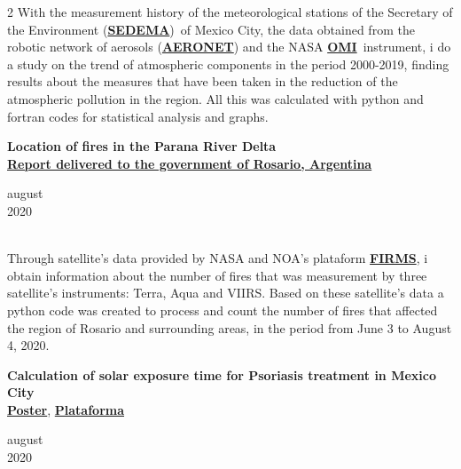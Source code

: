 \documentclass[a3paper,16pt]{adcv}
\newcommand*{\aeronet}{\href{https://aeronet.gsfc.nasa.gov/}{\textbf{AERONET}}}
\newcommand*{\sedema}{\href{https://www.sedema.cdmx.gob.mx/}{\textbf{SEDEMA}}}
\newcommand*{\omi}{\href{https://aura.gsfc.nasa.gov/omi.html}{\textbf{OMI}}}
\begin{document}
\begin{multicols}{2}
    With the measurement history of the meteorological stations of the Secretary of the Environment (\sedema)~of Mexico City,
    the data obtained from the robotic network of aerosols (\aeronet) and the NASA \omi~instrument, i do a study on the trend of atmospheric components
     in the period 2000-2019, finding results about the measures that have been taken in the reduction of the atmospheric pollution in the region.
     All this was calculated with python and fortran codes for statistical analysis and graphs.\\

  \begin{minipage}{0.8\linewidth}
    \textbf{Location of fires in the Parana River Delta}\\
    \href{https://github.com/giovannilopez9808/Posters_templates/blob/master/Informe\%20IFIR/Focos\%20de\%20incendio\%20en\%20las\%20islas\%20del\%20Paran\%C3\%A1\%20\%20frente\%20a\%20Rosario\%20\%20(Piacentini\%2C\%20Ipi\%C3\%B1a\%2C\%20Lopez-Padilla\%2C\%20Bolmaro)\%20(Piacentini).pdf}{\textbf{Report delivered to the government of Rosario, Argentina}}
  \end{minipage}
    \begin{minipage}{0.2\linewidth}
      \vspace{-0.7cm}
      \begin{flushright}
        august
        \\2020
      \end{flushright}
    \end{minipage}\\
  
    Through satellite's data provided by NASA and NOA's plataform \href{https://firms.modaps.eosdis.nasa.gov/}{\textbf{FIRMS}}, i obtain information about the
    number of fires that was measurement by three satellite's instruments: Terra, Aqua and VIIRS. Based on these satellite's data a python code was created
    to process and count the number of fires that affected the region of Rosario and surrounding areas, in the period from June 3 to August 4, 2020.\vspace{1cm}\\
  \begin{minipage}{0.8\linewidth}
    \textbf{Calculation of solar exposure time for Psoriasis treatment in Mexico City}\\
    \href{https://github.com/giovannilopez9808/Posters_templates/blob/master/2020/CNF/TES/main.pdf}{\textbf{Poster}}, \href{http://tes-v1.herokuapp.com/}{\textbf{Plataforma}}
  \end{minipage}
    \begin{minipage}{0.2\linewidth}
      \vspace{-0.9cm}
      \begin{flushright}
      august \\2020
      \end{flushright}
    \end{minipage}\\


\end{multicols}
\end{document}
